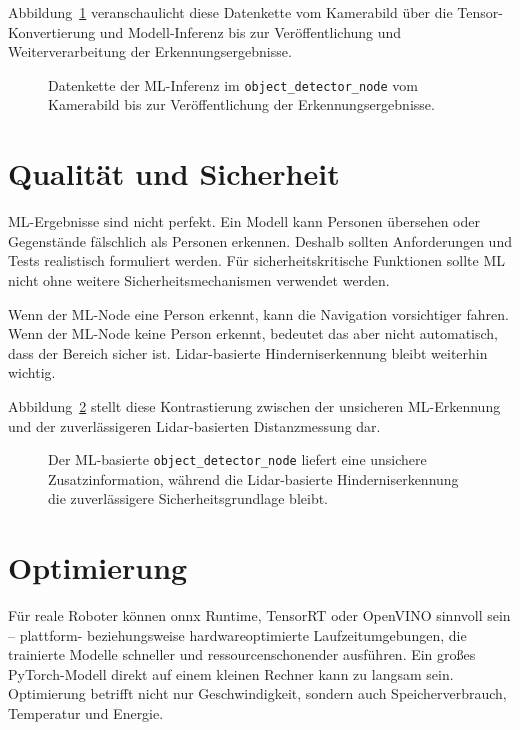 Abbildung~\ref{fig:kap18-datenkette-ml-inferenz} veranschaulicht diese Datenkette vom Kamerabild über die Tensor-Konvertierung und Modell-Inferenz bis zur Veröffentlichung und Weiterverarbeitung der Erkennungsergebnisse.

\begin{figure}[H]
  \centering
  \resizebox{\textwidth}{!}{}
  \caption{Datenkette der ML-Inferenz im \texttt{object\_detector\_node} vom Kamerabild bis zur Veröffentlichung der Erkennungsergebnisse.}
  \label{fig:kap18-datenkette-ml-inferenz}
\end{figure}

\section{Qualität und Sicherheit}
ML-Ergebnisse sind nicht perfekt. Ein Modell kann Personen übersehen oder Gegenstände fälschlich als Personen erkennen. Deshalb sollten Anforderungen und Tests realistisch formuliert werden. Für sicherheitskritische Funktionen sollte ML nicht ohne weitere Sicherheitsmechanismen verwendet werden.

\begin{praxisbox}
Wenn der ML-Node eine Person erkennt, kann die Navigation vorsichtiger fahren. Wenn der ML-Node keine Person erkennt, bedeutet das aber nicht automatisch, dass der Bereich sicher ist. Lidar-basierte Hinderniserkennung bleibt weiterhin wichtig.
\end{praxisbox}

Abbildung~\ref{fig:kap18-ml-sicherheitsarchitektur} stellt diese Kontrastierung zwischen der unsicheren ML-Erkennung und der zuverlässigeren Lidar-basierten Distanzmessung dar.

\begin{figure}[H]
  \centering
  \caption{Der ML-basierte \texttt{object\_detector\_node} liefert eine unsichere Zusatzinformation, während die Lidar-basierte Hinderniserkennung die zuverlässigere Sicherheitsgrundlage bleibt.}
  \label{fig:kap18-ml-sicherheitsarchitektur}
\end{figure}

\section{Optimierung}
Für reale Roboter können \gls{onnx} Runtime, TensorRT oder OpenVINO sinnvoll sein – plattform- beziehungsweise hardwareoptimierte Laufzeitumgebungen, die trainierte Modelle schneller und ressourcenschonender ausführen. Ein großes PyTorch-Modell direkt auf einem kleinen Rechner kann zu langsam sein. Optimierung betrifft nicht nur Geschwindigkeit, sondern auch Speicherverbrauch, Temperatur und Energie.

